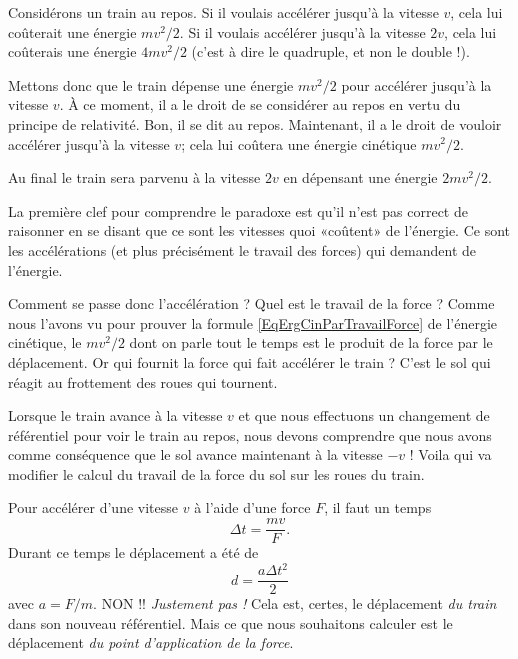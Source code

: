 \documentclass[a4paper,12pt]{book}
\theoremstyle{mes_exemples}	\newtheorem{exemple}[numtho]{Exemple}
\theoremstyle{mes_tho}
\begin{document}
\begin{probleme}
	Considérons un train au repos. Si il voulais accélérer jusqu'à la vitesse $v$, cela lui coûterait une énergie $mv^2/2$. Si il voulais accélérer jusqu'à la vitesse $2v$, cela lui coûterais une énergie $4mv^2/2$ (c'est à dire le quadruple, et non le double !).

	Mettons donc que le train dépense une énergie $mv^2/2$ pour accélérer jusqu'à la vitesse $v$. À ce moment, il a le droit de se considérer au repos en vertu du principe de relativité. Bon, il se dit au repos. Maintenant, il a le droit de vouloir accélérer jusqu'à la vitesse $v$; cela lui coûtera une énergie cinétique $mv^2/2$.

	Au final le train sera parvenu à la vitesse $2v$ en dépensant une énergie $2mv^2/2$.
\end{probleme}

La première clef pour comprendre le paradoxe est qu'il n'est pas correct de raisonner en se disant que ce sont les vitesses quoi «coûtent» de l'énergie. Ce sont les accélérations (et plus précisément le travail des forces) qui demandent de l'énergie.

Comment se passe donc l'accélération ? Quel est le travail de la force ? Comme nous l'avons vu pour prouver la formule \eqref{EqErgCinParTravailForce} de l'énergie cinétique, le $mv^2/2$ dont on parle tout le temps est le produit de la force par le déplacement. Or qui fournit la force qui fait accélérer le train ? C'est le sol qui réagit au frottement des roues qui tournent.

Lorsque le train avance à la vitesse $v$ et que nous effectuons un changement de référentiel pour voir le train au repos, nous devons comprendre que nous avons comme conséquence que le sol avance maintenant à la vitesse $-v$ ! Voila qui va modifier le calcul du travail de la force du sol sur les roues du train.

Pour accélérer d'une vitesse $v$ à l'aide d'une force $F$, il faut un temps
\begin{equation}
	\Delta t=\frac{ mv }{ F }.
\end{equation}
Durant ce temps le déplacement a été de
\begin{equation}
	d=\frac{ a\Delta t^2 }{ 2 }
\end{equation}
avec $a=F/m$. NON !! \emph{Justement pas !} Cela est, certes, le déplacement \emph{du train} dans son nouveau référentiel. Mais ce que nous souhaitons calculer est le déplacement \emph{du point d'application de la force}.
\end{document}
